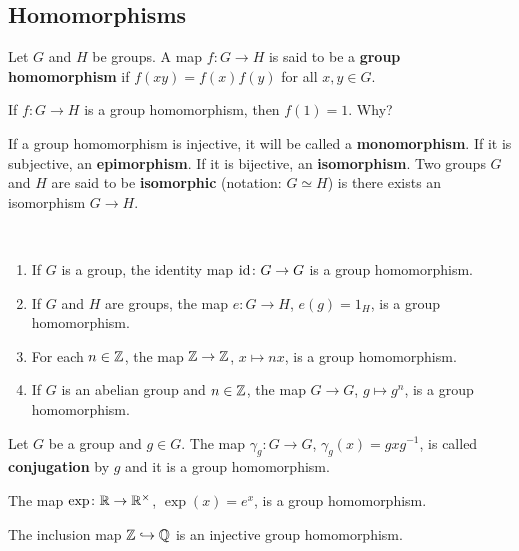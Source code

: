 \subsection{Homomorphisms}

\begin{definition}
        Let $G$ and $H$ be groups. 
        A map $f\colon G\to H$ is said to be a 
        \textbf{group homomorphism} if 
        $f(xy)=f(x)f(y)$ for all $x,y\in G$.
\end{definition}

If $f\colon G\to H$ is a group homomorphism, 
then $f(1)=1$. Why? 

If a group homomorphism is injective, it will be called
a \textbf{monomorphism}. If it is subjective, 
an \textbf{epimorphism}. If it is bijective, 
an \textbf{isomorphism}. Two groups $G$ and $H$ 
are said to be \textbf{isomorphic} (notation: $G\simeq H$)
is there exists an isomorphism $G\to H$.

\begin{example}\
\begin{enumerate}
\item If $G$ is a group, the identity map $\operatorname{id}\colon G\to G$ is a group
homomorphism. 
\item If $G$ and $H$ are groups, the map $e\colon G\to H$, $e(g)=1_H$,  is a group homomorphism. 
\item For each $n\in\mathbb{Z}$, the map $\mathbb{Z}\to\mathbb{Z}$, $x\mapsto nx$, is a group homomorphism. 
\item If $G$ is an abelian group and $n\in\mathbb{Z}$, the map $G\to G$, $g\mapsto g^n$, is a group
homomorphism. 
\end{enumerate}
\end{example}

\begin{example}
Let $G$ be a group and $g\in G$. The map $\gamma_g\colon G\to G$, $\gamma_g(x)=gxg^{-1}$, is called 
\textbf{conjugation} by $g$ and it is a group homomorphism. 
\end{example}

\begin{example}
The map $\exp\colon\mathbb{R}\to\mathbb{R}^\times$, $\exp(x)=e^x$, is a group homomorphism. 
\end{example}

\begin{example}
The inclusion map $\mathbb{Z}\hookrightarrow\mathbb{Q}$ is an injective group homomorphism. 
\end{example}

